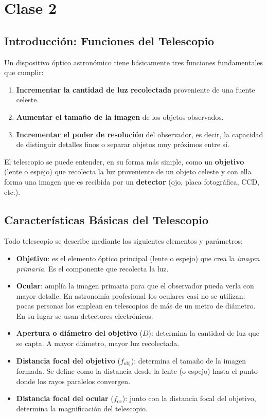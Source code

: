 \chapter{Clase 2}

\section{Introducción: Funciones del Telescopio}

Un dispositivo óptico astronómico tiene básicamente tres funciones fundamentales que cumplir:

\begin{enumerate}
    \item \textbf{Incrementar la cantidad de luz recolectada} proveniente de una fuente celeste.
    \item \textbf{Aumentar el tamaño de la imagen} de los objetos observados.
    \item \textbf{Incrementar el poder de resolución} del observador, es decir, la capacidad de distinguir detalles finos o separar objetos muy próximos entre sí.
\end{enumerate}

El telescopio se puede entender, en su forma más simple, como un \textbf{objetivo} (lente o espejo) que recolecta la luz proveniente de un objeto celeste y con ella forma una imagen que es recibida por un \textbf{detector} (ojo, placa fotográfica, CCD, etc.).

\section{Características Básicas del Telescopio}

Todo telescopio se describe mediante los siguientes elementos y parámetros:

\begin{itemize}
    \item \textbf{Objetivo}: es el elemento óptico principal (lente o espejo) que crea la \textit{imagen primaria}. Es el componente que recolecta la luz.
    \item \textbf{Ocular}: amplía la imagen primaria para que el observador pueda verla con mayor detalle. En astronomía profesional los oculares casi no se utilizan; pocas personas los emplean en telescopios de más de un metro de diámetro. En su lugar se usan detectores electrónicos.
    \item \textbf{Apertura o diámetro del objetivo} ($D$): determina la cantidad de luz que se capta. A mayor diámetro, mayor luz recolectada.
    \item \textbf{Distancia focal del objetivo} ($f_{\text{obj}}$): determina el tamaño de la imagen formada. Se define como la distancia desde la lente (o espejo) hasta el punto donde los rayos paralelos convergen.
    \item \textbf{Distancia focal del ocular} ($f_{\text{oc}}$): junto con la distancia focal del objetivo, determina la magnificación del telescopio.
\end{itemize}

